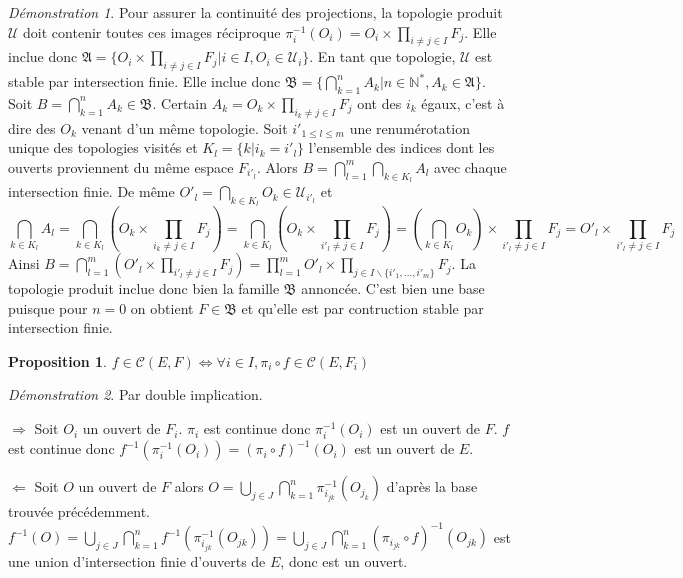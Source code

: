 \documentclass[a4paper, 11pt, french]{book}
\newenvironment{itemise}{\itemize}{\enditemize}
\theoremstyle{plain} %
\newtheorem{proposition}{Proposition}
\theoremstyle{definition} %
\theoremstyle{remark} %
\newtheorem*{demonstration}{Démonstration}
\renewcommand{\setminus}{\backslash}
\newcommand{\1}{\mathds{1}}
\newcommand{\cont}{\mathcal{C}}
\newcommand{\infegal}{\leqslant}
\newcommand{\inv}[1]{#1^{-1}}
\newcommand{\N}{\mathbb{N}}
\begin{document}
\begin{demonstration}
	Pour assurer la continuité des projections, la topologie produit $\mathscr{U}$ doit contenir toutes ces images réciproque $\inv{\pi_i}(O_i)=O_i\times\prod_{i\neq j\in I}F_j$.
	Elle inclue donc $\mathfrak{A}=\{O_i\times\prod_{i\neq j\in I}F_j|i\in I, O_i\in\mathscr{U}_i\}$.
	En tant que topologie, $\mathscr{U}$ est stable par intersection finie.
	Elle inclue donc $\mathfrak{B}=\{\bigcap_{k=1}^nA_k|n\in\N^*, A_k\in\mathfrak{A}\}$.
	Soit $B=\bigcap_{k=1}^nA_k\in\mathfrak{B}$.
	Certain $A_k=O_k\times\prod_{i_k\neq j\in I}F_j$ ont des $i_k$ égaux, c'est à dire des $O_k$ venant d'un même topologie.
	Soit $i'_{1\infegal l\infegal m}$ une renumérotation unique des topologies visités et $K_l=\{k|i_k=i'_l\}$ l'ensemble des indices dont les ouverts proviennent du même espace $F_{i'_l}$.
	Alors $B=\bigcap_{l=1}^m\bigcap_{k\in K_l}A_l$ avec chaque intersection finie.
	De même $O'_l=\bigcap_{k\in K_l}O_k\in\mathscr{U}_{i'_l}$ et
	$$
		\bigcap_{k\in K_l}A_l
		=\bigcap_{k\in K_l}(O_k\times\prod_{i_k\neq j\in I}F_j)
		=\bigcap_{k\in K_l}(O_k\times\prod_{i'_l\neq j\in I}F_j)
		=(\bigcap_{k\in K_l}O_k)\times\prod_{i'_l\neq j\in I}F_j
		=O'_l\times\prod_{i'_l\neq j\in I}F_j
	$$
	Ainsi $B=\bigcap_{l=1}^m(O'_l\times\prod_{i'_l\neq j\in I}F_j)=\prod_{l=1}^mO'_l\times\prod_{j\in I\setminus\{i'_1,...,i'_m\}}F_j$.
	La topologie produit inclue donc bien la famille $\mathfrak{B}$ annoncée.
	C'est bien une base puisque pour $n=0$ on obtient $F\in\mathfrak{B}$ et qu'elle est par contruction stable par intersection finie.
\end{demonstration}

\begin{proposition}
	$f\in\cont(E, F)\iff\forall i\in I, \pi_i\circ f\in\cont(E, F_i)$
\end{proposition}

\begin{demonstration}
	Par double implication.
	\begin{itemise}
		\item[$\Rightarrow$] Soit $O_i$ un ouvert de $F_i$.
		$\pi_i$ est continue donc $\inv{\pi_i}(O_i)$ est un ouvert de $F$.
		$f$ est continue donc $\inv{f}(\inv{\pi_i}(O_i))=\inv{(\pi_i\circ f)}(O_i)$ est un ouvert de $E$.
		\item[$\Leftarrow$] Soit $O$ un ouvert de $F$ alors $O=\bigcup_{j\in J}\bigcap_{k=1}^n\inv{\pi_{i_{jk}}}(O_{j_k})$ d'après la base trouvée précédemment.
		$\inv{f}(O)=\bigcup_{j\in J}\bigcap_{k=1}^n\inv{f}(\inv{\pi_{i_{jk}}}(O_{jk}))=\bigcup_{j\in J}\bigcap_{k=1}^n\inv{(\pi_{i_{jk}}\circ f)}(O_{jk})$ est une union d'intersection finie d'ouverts de $E$, donc est un ouvert.
	\end{itemise}
\end{demonstration}
\end{document}
